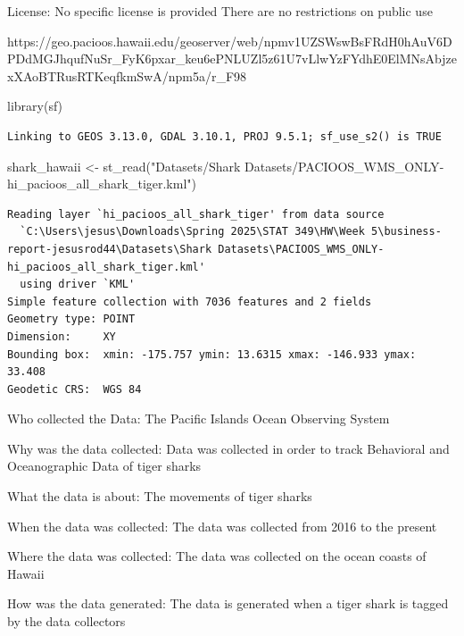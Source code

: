 \documentclass[
  letterpaper,
  DIV=11,
  numbers=noendperiod]{scrreprt}
\newenvironment{Shaded}{\begin{snugshade}}{\end{snugshade}}
\newcommand{\FunctionTok}[1]{\textcolor[rgb]{0.28,0.35,0.67}{#1}}
\newcommand{\NormalTok}[1]{\textcolor[rgb]{0.00,0.23,0.31}{#1}}
\newcommand{\OtherTok}[1]{\textcolor[rgb]{0.00,0.23,0.31}{#1}}
\newcommand{\StringTok}[1]{\textcolor[rgb]{0.13,0.47,0.30}{#1}}
\begin{document}
License: No specific license is provided There are no restrictions on
public use

https://geo.pacioos.hawaii.edu/geoserver/web/npmv1UZSWswBsFRdH0hAuV6DPDdMGJhqufNuSr\_FyK6pxar\_keu6ePNLUZl5z61U7vLlwYzFYdhE0ElMNsAbjzexXAoBTRusRTKeqfkmSwA/npm5a/r\_F98

\begin{Shaded}
\begin{Highlighting}[]
\FunctionTok{library}\NormalTok{(sf)}
\end{Highlighting}
\end{Shaded}

\begin{verbatim}
Linking to GEOS 3.13.0, GDAL 3.10.1, PROJ 9.5.1; sf_use_s2() is TRUE
\end{verbatim}

\begin{Shaded}
\begin{Highlighting}[]
\NormalTok{shark\_hawaii }\OtherTok{\textless{}{-}} \FunctionTok{st\_read}\NormalTok{(}\StringTok{"Datasets/Shark Datasets/PACIOOS\_WMS\_ONLY{-}hi\_pacioos\_all\_shark\_tiger.kml"}\NormalTok{)}
\end{Highlighting}
\end{Shaded}

\begin{verbatim}
Reading layer `hi_pacioos_all_shark_tiger' from data source 
  `C:\Users\jesus\Downloads\Spring 2025\STAT 349\HW\Week 5\business-report-jesusrod44\Datasets\Shark Datasets\PACIOOS_WMS_ONLY-hi_pacioos_all_shark_tiger.kml' 
  using driver `KML'
Simple feature collection with 7036 features and 2 fields
Geometry type: POINT
Dimension:     XY
Bounding box:  xmin: -175.757 ymin: 13.6315 xmax: -146.933 ymax: 33.408
Geodetic CRS:  WGS 84
\end{verbatim}

Who collected the Data: The Pacific Islands Ocean Observing System

Why was the data collected: Data was collected in order to track
Behavioral and Oceanographic Data of tiger sharks

What the data is about: The movements of tiger sharks

When the data was collected: The data was collected from 2016 to the
present

Where the data was collected: The data was collected on the ocean coasts
of Hawaii

How was the data generated: The data is generated when a tiger shark is
tagged by the data collectors
\end{document}
